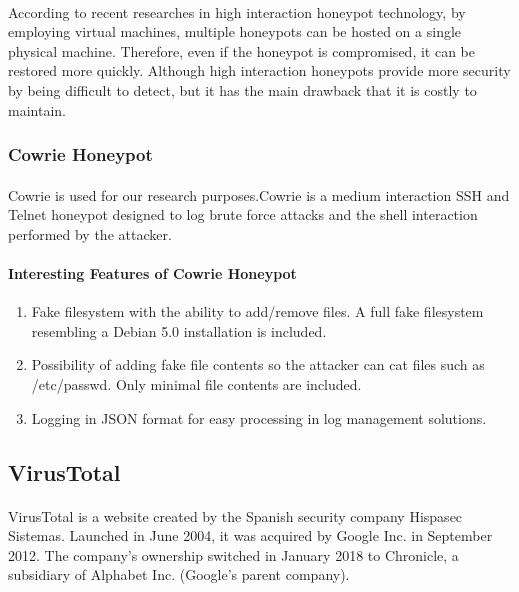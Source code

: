 \documentclass{article}
\begin{document}
\paragraph{}
According to recent researches in high interaction honeypot technology, by employing virtual machines, multiple honeypots can be hosted on a single physical machine. Therefore, even if the honeypot is compromised, it can be restored more quickly. Although high interaction honeypots provide more security by being difficult to detect, but it has the main drawback that it is costly to maintain.

\subsubsection{Cowrie Honeypot}
\paragraph{}
Cowrie is used for our research purposes.Cowrie is a medium interaction SSH and Telnet honeypot designed to log brute force attacks and the shell interaction performed by the attacker.
\paragraph{Interesting Features of Cowrie Honeypot}

\begin{enumerate}
\item Fake filesystem with the ability to add/remove files. A full fake filesystem resembling a Debian 5.0 installation is included.
\item Possibility of adding fake file contents so the attacker can cat files such as /etc/passwd. Only minimal file contents are included.
\item Logging in JSON format for easy processing in log management solutions.
\end{enumerate}

\subsection{VirusTotal}
\paragraph{}
VirusTotal is a website created by the Spanish security company Hispasec Sistemas. Launched in June 2004, it was acquired by Google Inc. in September 2012. The company's ownership switched in January 2018 to Chronicle, a subsidiary of Alphabet Inc. (Google's parent company).
\end{document}
